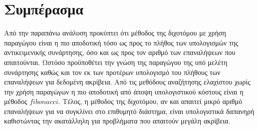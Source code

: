 \documentclass{article}
\begin{document}
\section*{Συμπέρασμα}

Από την παραπάνω ανάλυση προκύπτει ότι μέθοδος της διχοτόμου με χρήση παραγώγου είναι η πιο αποδοτική τόσο
ως προς το πλήθος των υπολογισμών της αντικειμενικής συνάρτησης, όσο και ως προς τον αριθμό των επαναλήψεων
που απαιτούνται. Ωστόσο προϋποθέτει την γνώση της παραγώγου της υπό μελέτη συνάρτησης καθώς και τον εκ των
προτέρων υπολογισμό του πλήθους των επαναλήψεων για δεδομένη ακρίβεια. Από τις μεθόδους αναζήτησης ελαχίστου 
χωρίς την χρήση παραγώγων η πιο αποδοτική από άποψη υπολογιστικού κόστους είναι η μέθοδος $fibonacci$. Τέλος,
η μέθοδος της διχοτόμου, αν και απαιτεί μικρό αριθμό επαναλήψεων για να συγκλίνει στο επιθυμητό διάστημα,
είναι υπολογιστικά δαπανηρή καθιστώντας την ακατάλληλη για προβλήματα που απαιτούν μεγάλη ακρίβεια.
\end{document}
